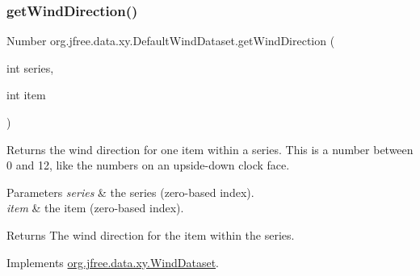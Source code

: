 \mbox{\label{classorg_1_1jfree_1_1data_1_1xy_1_1_default_wind_dataset_aa548182054c24afc0a4e2ac429fe81e9}} 
\subsubsection{\texorpdfstring{get\+Wind\+Direction()}{getWindDirection()}}
{\footnotesize\ttfamily Number org.\+jfree.\+data.\+xy.\+Default\+Wind\+Dataset.\+get\+Wind\+Direction (\begin{DoxyParamCaption}\item[{int}]{series,  }\item[{int}]{item }\end{DoxyParamCaption})}

Returns the wind direction for one item within a series. This is a number between 0 and 12, like the numbers on an upside-\/down clock face.


\begin{DoxyParams}{Parameters}
{\em series} & the series (zero-\/based index). \\
\hline
{\em item} & the item (zero-\/based index).\\
\hline
\end{DoxyParams}
\begin{DoxyReturn}{Returns}
The wind direction for the item within the series. 
\end{DoxyReturn}


Implements \mbox{\hyperlink{interfaceorg_1_1jfree_1_1data_1_1xy_1_1_wind_dataset_a09dd402242d69a323703cedf2574a876}{org.\+jfree.\+data.\+xy.\+Wind\+Dataset}}.

\mbox{\label{classorg_1_1jfree_1_1data_1_1xy_1_1_default_wind_dataset_a39588ba40d03b43b02d85b20027eab4f}} 

